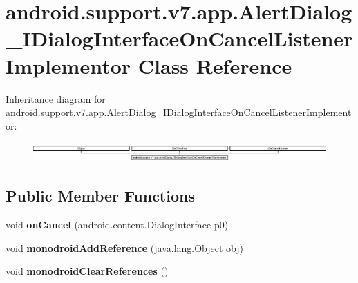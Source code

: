 \hypertarget{classandroid_1_1support_1_1v7_1_1app_1_1_alert_dialog___i_dialog_interface_on_cancel_listener_implementor}{}\section{android.\+support.\+v7.\+app.\+Alert\+Dialog\+\_\+\+I\+Dialog\+Interface\+On\+Cancel\+Listener\+Implementor Class Reference}
\label{classandroid_1_1support_1_1v7_1_1app_1_1_alert_dialog___i_dialog_interface_on_cancel_listener_implementor}
Inheritance diagram for android.\+support.\+v7.\+app.\+Alert\+Dialog\+\_\+\+I\+Dialog\+Interface\+On\+Cancel\+Listener\+Implementor\+:\begin{figure}[H]
\begin{center}
\leavevmode
\includegraphics[height=0.771350cm]{classandroid_1_1support_1_1v7_1_1app_1_1_alert_dialog___i_dialog_interface_on_cancel_listener_implementor}
\end{center}
\end{figure}
\subsection*{Public Member Functions}
\begin{DoxyCompactItemize}
\item 
\mbox{\label{classandroid_1_1support_1_1v7_1_1app_1_1_alert_dialog___i_dialog_interface_on_cancel_listener_implementor_ae2ec072b3df6d4e38f2537cf8b7a4978}} 
void {\bfseries on\+Cancel} (android.\+content.\+Dialog\+Interface p0)
\item 
\mbox{\label{classandroid_1_1support_1_1v7_1_1app_1_1_alert_dialog___i_dialog_interface_on_cancel_listener_implementor_a3d21bf61ee97426dcae3644ed4fe5be4}} 
void {\bfseries monodroid\+Add\+Reference} (java.\+lang.\+Object obj)
\item 
\mbox{\label{classandroid_1_1support_1_1v7_1_1app_1_1_alert_dialog___i_dialog_interface_on_cancel_listener_implementor_a090abc2cc0327da238bc171c57f28c56}} 
void {\bfseries monodroid\+Clear\+References} ()
\end{DoxyCompactItemize}
